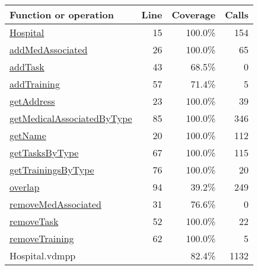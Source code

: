 \bigskip
\begin{longtable}{|l|r|r|r|}
\hline
Function or operation & Line & Coverage & Calls \\
\hline
\hline
\hyperref[Hospital:15]{Hospital} & 15&100.0\% & 154 \\
\hline
\hyperref[addMedAssociated:26]{addMedAssociated} & 26&100.0\% & 65 \\
\hline
\hyperref[addTask:43]{addTask} & 43&68.5\% & 0 \\
\hline
\hyperref[addTraining:57]{addTraining} & 57&71.4\% & 5 \\
\hline
\hyperref[getAddress:23]{getAddress} & 23&100.0\% & 39 \\
\hline
\hyperref[getMedicalAssociatedByType:85]{getMedicalAssociatedByType} & 85&100.0\% & 346 \\
\hline
\hyperref[getName:20]{getName} & 20&100.0\% & 112 \\
\hline
\hyperref[getTasksByType:67]{getTasksByType} & 67&100.0\% & 115 \\
\hline
\hyperref[getTrainingsByType:76]{getTrainingsByType} & 76&100.0\% & 20 \\
\hline
\hyperref[overlap:94]{overlap} & 94&39.2\% & 249 \\
\hline
\hyperref[removeMedAssociated:31]{removeMedAssociated} & 31&76.6\% & 0 \\
\hline
\hyperref[removeTask:52]{removeTask} & 52&100.0\% & 22 \\
\hline
\hyperref[removeTraining:62]{removeTraining} & 62&100.0\% & 5 \\
\hline
\hline
Hospital.vdmpp & & 82.4\% & 1132 \\
\hline
\end{longtable}

